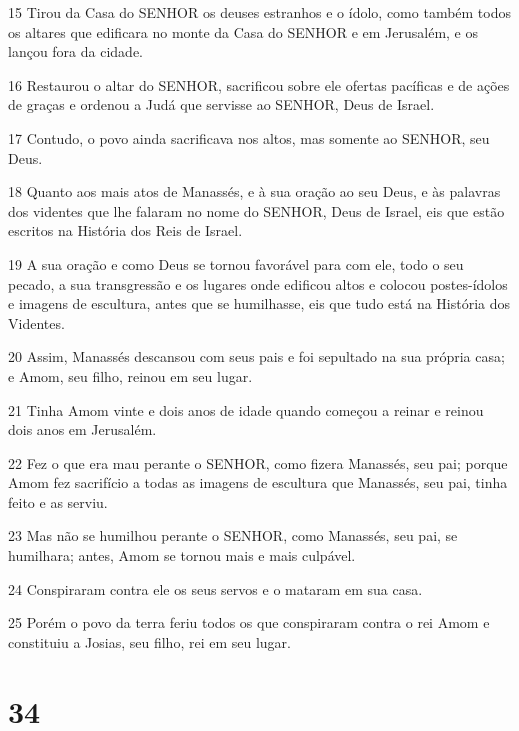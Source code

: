 \par 15 Tirou da Casa do SENHOR os deuses estranhos e o ídolo, como também todos os altares que edificara no monte da Casa do SENHOR e em Jerusalém, e os lançou fora da cidade.
\par 16 Restaurou o altar do SENHOR, sacrificou sobre ele ofertas pacíficas e de ações de graças e ordenou a Judá que servisse ao SENHOR, Deus de Israel.
\par 17 Contudo, o povo ainda sacrificava nos altos, mas somente ao SENHOR, seu Deus.
\par 18 Quanto aos mais atos de Manassés, e à sua oração ao seu Deus, e às palavras dos videntes que lhe falaram no nome do SENHOR, Deus de Israel, eis que estão escritos na História dos Reis de Israel.
\par 19 A sua oração e como Deus se tornou favorável para com ele, todo o seu pecado, a sua transgressão e os lugares onde edificou altos e colocou postes-ídolos e imagens de escultura, antes que se humilhasse, eis que tudo está na História dos Videntes.
\par 20 Assim, Manassés descansou com seus pais e foi sepultado na sua própria casa; e Amom, seu filho, reinou em seu lugar.
\par 21 Tinha Amom vinte e dois anos de idade quando começou a reinar e reinou dois anos em Jerusalém.
\par 22 Fez o que era mau perante o SENHOR, como fizera Manassés, seu pai; porque Amom fez sacrifício a todas as imagens de escultura que Manassés, seu pai, tinha feito e as serviu.
\par 23 Mas não se humilhou perante o SENHOR, como Manassés, seu pai, se humilhara; antes, Amom se tornou mais e mais culpável.
\par 24 Conspiraram contra ele os seus servos e o mataram em sua casa.
\par 25 Porém o povo da terra feriu todos os que conspiraram contra o rei Amom e constituiu a Josias, seu filho, rei em seu lugar.

\chapter{34}

